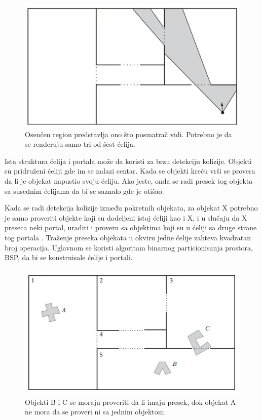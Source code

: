 \documentclass[12pt,oneside]{memoir}
\begin{document}
\begin{figure}[h!]
	\begin{center}
	\includegraphics[scale=1]{cellsRooms.jpg}
	\end{center}
	\caption{Osenčen region predstavlja ono što posmatrač vidi. 
	Potrebno je da se renderuju samo tri od šest ćelija. }
	\label{fig:cellsRooms}
\end{figure}

Ista struktura ćelija i portala može da koristi za brzu detekciju kolizije. 
Objekti su pridruženi ćeliji gde im se nalazi centar. Kada se objekti kreću vrši 
se provera da li je objekat napustio svoju ćeliju. Ako jeste, onda se radi presek tog objekta
sa susednim ćelijama da bi se saznalo gde je otišao. 

Kada se radi detekcija kolizije između pokretnih objekata, za objekat X 
potrebno je samo proveriti objekte koji su dodeljeni istoj ćeliji kao i X, i u slučaju
da X preseca neki portal, uraditi i proveru sa objektima koji su u ćeliji sa druge strane tog portala \cite{cells}.
Traženje preseka objekata u okviru jedne ćelije zahteva kvadratan broj operacija.
Uglavnom se koristi algoritam binarnog particionisanja prostora, BSP, da bi se konstruisale
ćelije i portali.

\begin{figure}[h!]
	\begin{center}
	\includegraphics[scale=1]{cellsObj.jpg}
	\end{center}
	\caption{ Objekti B i C se moraju proveriti da li imaju presek, dok objekat A ne mora da se proveri ni sa jednim objektom. }
	\label{fig:cellsObj}
\end{figure}
\end{document}
